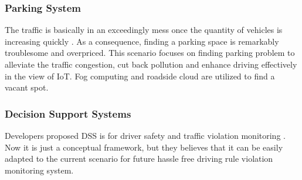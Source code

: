 \documentclass[10pt,a4paper,journal]{IEEEtran}
\begin{document}
\subsubsection{Parking System}
	The traffic is basically in an exceedingly mess once the quantity of vehicles is increasing quickly \cite{14}. As a consequence, finding a parking space is remarkably troublesome and overpriced. This scenario focuses on finding parking problem to alleviate the traffic congestion, cut back pollution and enhance driving effectively in the view of IoT. Fog computing and roadside cloud are utilized to find a vacant spot.
\subsubsection{Decision Support Systems}
	Developers proposed DSS is for driver safety and traffic violation monitoring \cite{15}. Now it is just a conceptual framework, but they believes that it can be easily adapted to the current scenario for future hassle free driving rule violation monitoring system.
\end{document}
